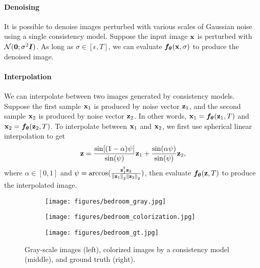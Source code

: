 \begin{appendices}
\paragraph{Denoising} It is possible to denoise images perturbed with various scales of Gaussian noise using a single consistency model. Suppose the input image ${\mathbf{x}}$ is perturbed with $\mathcal{N}(\bm{0}; \sigma^2 {\bm{I}})$. As long as $\sigma \in [\epsilon, T]$, we can evaluate ${\bm{f}}_{\bm{\theta}}({\mathbf{x}}, \sigma)$ to produce the denoised image.

\paragraph{Interpolation} We can interpolate between two images generated by consistency models. Suppose the first sample ${\mathbf{x}}_1$ is produced by noise vector ${\mathbf{z}}_1$, and the second sample ${\mathbf{x}}_2$ is produced by noise vector ${\mathbf{z}}_2$. In other words, ${\mathbf{x}}_1 = {\bm{f}}_{\bm{\theta}}({\mathbf{z}}_1, T)$ and ${\mathbf{x}}_2 = {\bm{f}}_{\bm{\theta}}({\mathbf{z}}_2, T)$. To interpolate between ${\mathbf{x}}_1$ and ${\mathbf{x}}_2$, we first use spherical linear interpolation to get
\begin{align*}
    {\mathbf{z}} = \frac{\sin[(1-\alpha) \psi]}{\sin(\psi)} {\mathbf{z}}_1 + \frac{\sin(\alpha \psi)}{\sin(\psi)}{\mathbf{z}}_2,
\end{align*}
where $\alpha \in [0, 1]$ and $\psi = \arccos(\frac{{\mathbf{z}}_1^{\mkern-1.5mu\mathsf{T}} {\mathbf{z}}_2}{\left\lVert{\mathbf{z}}_1\right\rVert_2 \left\lVert{\mathbf{z}}_2\right\rVert_2})$, then evaluate ${\bm{f}}_{\bm{\theta}}({\mathbf{z}}, T)$ to produce the interpolated image.

\begin{figure}
    \centering
    \begin{subfigure}[b]{0.11\textwidth}
        \texttt{[image: figures/bedroom\_gray.jpg]}
    \end{subfigure}\hfill
    \begin{subfigure}[b]{0.77\textwidth}
        \texttt{[image: figures/bedroom\_colorization.jpg]}
    \end{subfigure}\hfill
    \begin{subfigure}[b]{0.11\textwidth}
        \texttt{[image: figures/bedroom\_gt.jpg]}
    \end{subfigure}\hfill
    \caption{Gray-scale images (left), colorized images by a consistency model (middle), and ground truth (right).}
    \label{fig:bedroom_colorization}
\end{figure}


\end{appendices}
